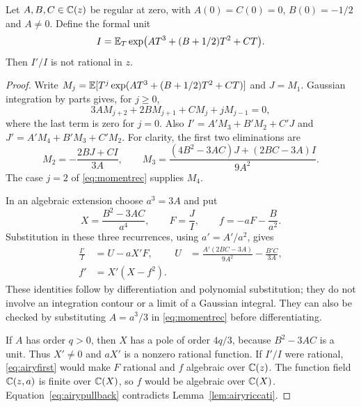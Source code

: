 \begin{lemma}\label{lem:cubicgaussian}
Let $A,B,C\in\mathbb C(z)$ be regular at zero, with $A(0)=C(0)=0$,
$B(0)=-1/2$ and $A\ne0$. Define the formal unit
\[
 I=\mathbb E_T\exp\bigl(AT^3+(B+1/2)T^2+CT\bigr).
\]
Then $I'/I$ is not rational in $z$.
\end{lemma}
\begin{proof}
Write $M_j=\mathbb E[T^j\exp(AT^3+(B+1/2)T^2+CT)]$ and $J=M_1$.
Gaussian integration by parts gives, for $j\geq0$,
\begin{equation}\label{eq:momentrec}
 3A M_{j+2}+2B M_{j+1}+C M_j+jM_{j-1}=0,
\end{equation}
where the last term is zero for $j=0$. Also
$I'=A'M_3+B'M_2+C'J$ and $J'=A'M_4+B'M_3+C'M_2$.
For clarity, the first two eliminations are
\[
 M_2=-\frac{2BJ+CI}{3A},\qquad
 M_3=\frac{(4B^2-3AC)J+(2BC-3A)I}{9A^2}.
\]
The case $j=2$ of \eqref{eq:momentrec} supplies $M_4$.

In an algebraic extension choose $a^3=3A$ and put
\[
 X=\frac{B^2-3AC}{a^4},\qquad F=\frac JI,
 \qquad f=-aF-\frac B{a^2}.
\]
Substitution in these three recurrences, using $a'=A'/a^2$, gives
\begin{align}
 \frac{I'}I&=U-aX'F,
 &U&=\frac{A'(2BC-3A)}{9A^2}-\frac{B'C}{3A},\label{eq:airyfirst}\\
 f'&=X'(X-f^2).\label{eq:airypullback}
\end{align}
These identities follow by differentiation and polynomial substitution;
they do not involve an integration contour or a limit of a Gaussian
integral. They can also be checked by substituting $A=a^3/3$ in
\eqref{eq:momentrec} before differentiating.

If $A$ has order $q>0$, then $X$ has a pole of order $4q/3$,
because $B^2-3AC$ is a unit. Thus $X'\ne0$ and $aX'$ is a nonzero
rational function. If $I'/I$ were rational, \eqref{eq:airyfirst}
would make $F$ rational and $f$ algebraic over $\mathbb C(z)$. The function
field $\mathbb C(z,a)$ is finite over $\mathbb C(X)$, so $f$ would be algebraic
over $\mathbb C(X)$. Equation~\eqref{eq:airypullback} contradicts
Lemma~\ref{lem:airyriccati}.
\end{proof}

